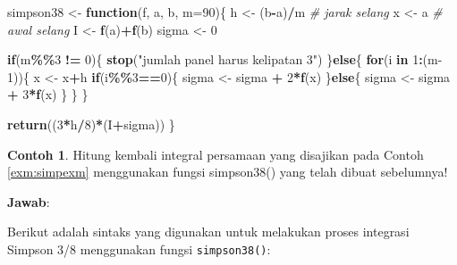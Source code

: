 \documentclass[
]{book}
\newenvironment{Shaded}{\begin{snugshade}}{\end{snugshade}}
\newcommand{\AttributeTok}[1]{\textcolor[rgb]{0.13,0.29,0.53}{#1}}
\newcommand{\CommentTok}[1]{\textcolor[rgb]{0.56,0.35,0.01}{\textit{#1}}}
\newcommand{\ControlFlowTok}[1]{\textcolor[rgb]{0.13,0.29,0.53}{\textbf{#1}}}
\newcommand{\DecValTok}[1]{\textcolor[rgb]{0.00,0.00,0.81}{#1}}
\newcommand{\FunctionTok}[1]{\textcolor[rgb]{0.13,0.29,0.53}{\textbf{#1}}}
\newcommand{\NormalTok}[1]{#1}
\newcommand{\OtherTok}[1]{\textcolor[rgb]{0.56,0.35,0.01}{#1}}
\newcommand{\SpecialCharTok}[1]{\textcolor[rgb]{0.81,0.36,0.00}{\textbf{#1}}}
\newcommand{\StringTok}[1]{\textcolor[rgb]{0.31,0.60,0.02}{#1}}
\theoremstyle{definition}
\theoremstyle{definition}
\newtheorem{example}{Contoh}[chapter]
\theoremstyle{definition}
\theoremstyle{definition}
\theoremstyle{remark}
\begin{document}
\begin{Shaded}
\begin{Highlighting}[]
\NormalTok{simpson38 }\OtherTok{\textless{}{-}} \ControlFlowTok{function}\NormalTok{(f, a, b, }\AttributeTok{m=}\DecValTok{90}\NormalTok{)\{}
\NormalTok{  h }\OtherTok{\textless{}{-}}\NormalTok{ (b}\SpecialCharTok{{-}}\NormalTok{a)}\SpecialCharTok{/}\NormalTok{m }\CommentTok{\# jarak selang}
\NormalTok{  x }\OtherTok{\textless{}{-}}\NormalTok{ a }\CommentTok{\# awal selang}
\NormalTok{  I }\OtherTok{\textless{}{-}} \FunctionTok{f}\NormalTok{(a)}\SpecialCharTok{+}\FunctionTok{f}\NormalTok{(b)}
\NormalTok{  sigma }\OtherTok{\textless{}{-}} \DecValTok{0}
  
  \ControlFlowTok{if}\NormalTok{(m}\SpecialCharTok{\%\%}\DecValTok{3} \SpecialCharTok{!=} \DecValTok{0}\NormalTok{)\{}
    \FunctionTok{stop}\NormalTok{(}\StringTok{"jumlah panel harus kelipatan 3"}\NormalTok{)}
\NormalTok{  \}}\ControlFlowTok{else}\NormalTok{\{}
    \ControlFlowTok{for}\NormalTok{(i }\ControlFlowTok{in} \DecValTok{1}\SpecialCharTok{:}\NormalTok{(m}\DecValTok{{-}1}\NormalTok{))\{}
\NormalTok{      x }\OtherTok{\textless{}{-}}\NormalTok{ x}\SpecialCharTok{+}\NormalTok{h}
      \ControlFlowTok{if}\NormalTok{(i}\SpecialCharTok{\%\%}\DecValTok{3}\SpecialCharTok{==}\DecValTok{0}\NormalTok{)\{}
\NormalTok{      sigma }\OtherTok{\textless{}{-}}\NormalTok{ sigma }\SpecialCharTok{+} \DecValTok{2}\SpecialCharTok{*}\FunctionTok{f}\NormalTok{(x)}
\NormalTok{      \}}\ControlFlowTok{else}\NormalTok{\{}
\NormalTok{      sigma }\OtherTok{\textless{}{-}}\NormalTok{ sigma }\SpecialCharTok{+} \DecValTok{3}\SpecialCharTok{*}\FunctionTok{f}\NormalTok{(x)}
\NormalTok{      \}}
\NormalTok{    \}}
\NormalTok{  \}}
  
  \FunctionTok{return}\NormalTok{((}\DecValTok{3}\SpecialCharTok{*}\NormalTok{h}\SpecialCharTok{/}\DecValTok{8}\NormalTok{)}\SpecialCharTok{*}\NormalTok{(I}\SpecialCharTok{+}\NormalTok{sigma))}
\NormalTok{\}}
\end{Highlighting}
\end{Shaded}

\begin{example}
\protect\hypertarget{exm:simp38exm}{}\label{exm:simp38exm}Hitung kembali integral persamaan yang disajikan pada Contoh \ref{exm:simpexm} menggunakan fungsi simpson38() yang telah dibuat sebelumnya!
\end{example}

\textbf{Jawab}:

Berikut adalah sintaks yang digunakan untuk melakukan proses integrasi Simpson 3/8 menggunakan fungsi \texttt{simpson38()}:
\end{document}
